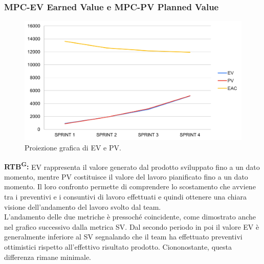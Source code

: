 \documentclass[8pt]{article}
\newcommand{\glossterm}[1]{#1\textsuperscript{G}} %
\begin{document}
\subsubsection{MPC-EV Earned Value e MPC-PV Planned Value}
\begin{figure}[h!]
    \centering
    \includegraphics[width=1\textwidth]{images_pdq/EV_PV.png}
    \caption{Proiezione grafica di EV e PV.}
    \label{fig:Proiezione grafica di EV e PV}
\end{figure}
\textbf{\glossterm{RTB}:} EV rappresenta il valore generato dal prodotto sviluppato fino a un dato momento, mentre PV costituisce il valore del lavoro pianificato fino a un dato momento. Il loro confronto permette di comprendere lo scostamento che avviene tra i preventivi e i consuntivi di lavoro effettuati e quindi ottenere una chiara visione dell'andamento del lavoro svolto dal team.\\
L'andamento delle due metriche è pressoché coincidente, come dimostrato anche nel grafico successivo dalla metrica SV. Dal secondo periodo in poi il valore EV è generalmente inferiore al SV segnalando che il team ha effettuato preventivi ottimistici rispetto all'effettivo risultato prodotto. Ciononostante, questa differenza rimane minimale.
\clearpage
\end{document}

